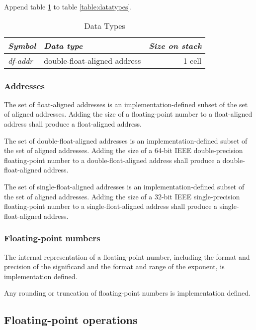 Append table \ref{float:types} to table \ref{table:datatypes}.

\begin{table}[ht]
  \begin{center}
	\caption{Data Types}
	\label{float:types}
	\begin{tabular}{llr}
	\hline\hline
	\emph{Symbol} & \emph{Data type} & \emph{Size on stack} \\
	\hline
	\emph{df-addr}	& double-float-aligned address	& 1 cell \\
	\hline\hline
	\end{tabular}
  \end{center}
\end{table}

\subsubsection{Addresses} %
\label{float:addr}

The set of float-aligned addresses is an implementation-defined
subset of the set of aligned addresses. Adding the size of a
floating-point number to a float-aligned address shall produce
a float-aligned address.

The set of double-float-aligned addresses is an implementation-defined
subset of the set of aligned addresses. Adding the size of a 64-bit
IEEE double-precision floating-point number to a double-float-aligned
address shall produce a double-float-aligned address.

The set of single-float-aligned addresses is an implementation-defined
subset of the set of aligned addresses. Adding the size of a 32-bit
IEEE single-precision floating-point number to a single-float-aligned
address shall produce a single-float-aligned address.

\subsubsection{Floating-point numbers} %
\label{float:num}

The internal representation of a floating-point number, including the
format and precision of the significand and the format and range of
the exponent, is implementation defined.

Any rounding or truncation of floating-point numbers is implementation
defined.

\subsection{Floating-point operations} %
\label{float:ops}

